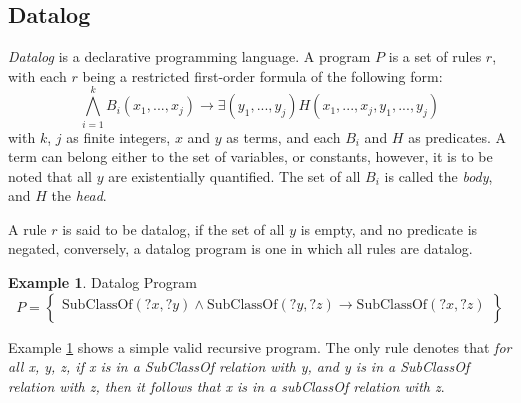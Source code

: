 \documentclass[manuscript,screen,review]{acmart}
\theoremstyle{definition}
\newtheorem{exmp}{Example}[section]
\begin{document}
\subsection{Datalog}

\textit{Datalog}\cite{all_you_ever_wanted_to_ask} is a declarative programming language. A program $P$ is a set of
rules $r$, with each $r$ being a restricted first-order formula of the following form: \[\bigwedge_{i=1}^kB_i(x_1, ..., x_j) \rightarrow \exists (y_1, ..., y_j)H(x_1, ..., x_j, y_1, ..., y_j)\]
with $k$, $j$ as finite integers, $x$ and $y$ as terms, and each $B_i$ and $H$ as predicates. A term can belong
either to the set of variables, or constants, however, it is to be noted that all $y$ are existentially quantified.
The set of all $B_i$ is called the \textit{body}, and $H$ the \textit{head}.

A rule $r$ is said to be datalog, if the set of all $y$ is empty, and no predicate is negated, conversely, a
datalog program is one in which all rules are datalog.
\begin{exmp}{Datalog Program}\label{ex1}
	\[
		P = \left\{  \begin{array}{l}
			\text{SubClassOf}(?x, ?y) \wedge \text{SubClassOf}(?y, ?z) \rightarrow \text{SubClassOf}(?x, ?z) \\
		\end{array}\right\}
	\]
\end{exmp}
Example \ref{ex1} shows a simple valid recursive program. The only rule denotes that \textit{for all x, y, z, if x is
	in a SubClassOf relation with y, and y is in a SubClassOf relation with z, then it follows that x is in a subClassOf
	relation with z}.
\end{document}
